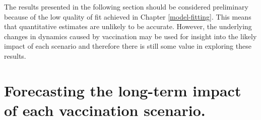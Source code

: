 \documentclass[11pt,twoside]{bristolthesis}
\begin{document}
  The results presented in the following section should be considered preliminary because of the low quality of fit achieved in Chapter \ref{model-fitting}. This means that quantitative estimates are unlikely to be accurate. However, the underlying changes in dynamics caused by vaccination may be used for insight into the likely impact of each scenario and therefore there is still some value in exploring these results.
  
  \hypertarget{forecasting-the-long-term-impact-of-each-vaccination-scenario.}{%
  \section{Forecasting the long-term impact of each vaccination scenario.}\label{forecasting-the-long-term-impact-of-each-vaccination-scenario.}}
  
\end{document}

